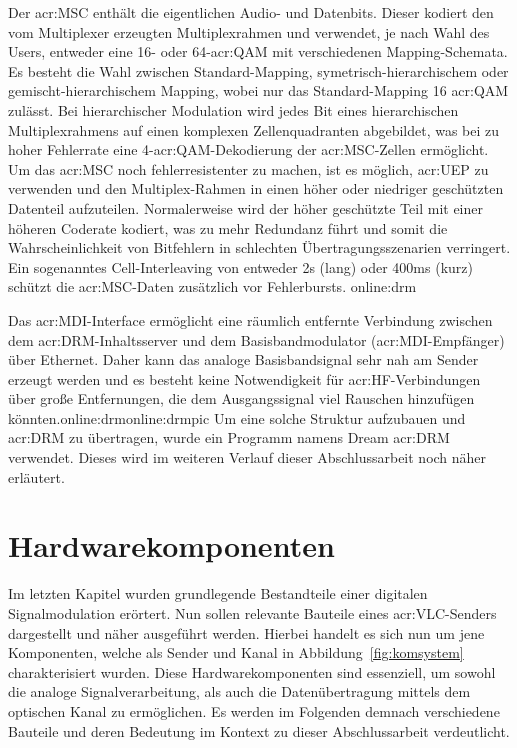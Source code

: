 Der \gls{acr:MSC} enthält die eigentlichen Audio- und Datenbits. Dieser kodiert den vom Multiplexer erzeugten Multiplexrahmen und verwendet, je nach Wahl des Users, entweder eine 16- oder 64-\gls{acr:QAM} mit verschiedenen Mapping-Schemata. Es besteht die Wahl zwischen Standard-Mapping, symetrisch-hierarchischem oder gemischt-hierarchischem Mapping, wobei nur das Standard-Mapping 16 \gls{acr:QAM} zulässt. Bei hierarchischer Modulation wird jedes Bit eines hierarchischen Multiplexrahmens auf einen komplexen Zellenquadranten abgebildet, was bei zu hoher Fehlerrate eine 4-\gls{acr:QAM}-Dekodierung der \gls{acr:MSC}-Zellen ermöglicht. Um das \gls{acr:MSC} noch fehlerresistenter zu machen, ist es möglich, \gls{acr:UEP} zu verwenden und den Multiplex-Rahmen in einen höher oder niedriger geschützten Datenteil aufzuteilen. Normalerweise wird der höher geschützte Teil mit einer höheren Coderate kodiert, was zu mehr Redundanz führt und somit die Wahrscheinlichkeit von Bitfehlern in schlechten Übertragungsszenarien verringert. Ein sogenanntes Cell-Interleaving von entweder 2s (lang) oder 400ms (kurz) schützt die \gls{acr:MSC}-Daten zusätzlich vor Fehlerbursts. \gls{online:drm}

Das \gls{acr:MDI}-Interface ermöglicht eine räumlich entfernte Verbindung zwischen dem \gls{acr:DRM}-Inhaltsserver und dem Basisbandmodulator (\gls{acr:MDI}-Empfänger) über Ethernet. Daher kann das analoge Basisbandsignal sehr nah am Sender erzeugt werden und es besteht keine Notwendigkeit für \gls{acr:HF}-Verbindungen über große Entfernungen, die dem Ausgangssignal viel Rauschen hinzufügen könnten.\gls{online:drm}\gls{online:drmpic} Um eine solche Struktur aufzubauen und \gls{acr:DRM} zu übertragen, wurde ein Programm namens Dream \gls{acr:DRM} verwendet. Dieses wird im weiteren Verlauf dieser Abschlussarbeit noch näher erläutert. 
\newpage
\section{Hardwarekomponenten}
\label{subsec:elbau}
Im letzten Kapitel wurden grundlegende Bestandteile einer digitalen Signalmodulation erörtert. Nun sollen relevante Bauteile eines \gls{acr:VLC}-Senders dargestellt und näher ausgeführt werden. Hierbei handelt es sich nun um jene Komponenten, welche als Sender und Kanal in Abbildung~\ref{fig:komsystem} charakterisiert wurden. Diese Hardwarekomponenten sind essenziell, um sowohl die analoge Signalverarbeitung, als auch die Datenübertragung mittels dem optischen Kanal zu ermöglichen. Es werden im Folgenden demnach verschiedene Bauteile und deren Bedeutung im Kontext zu dieser Abschlussarbeit verdeutlicht.

